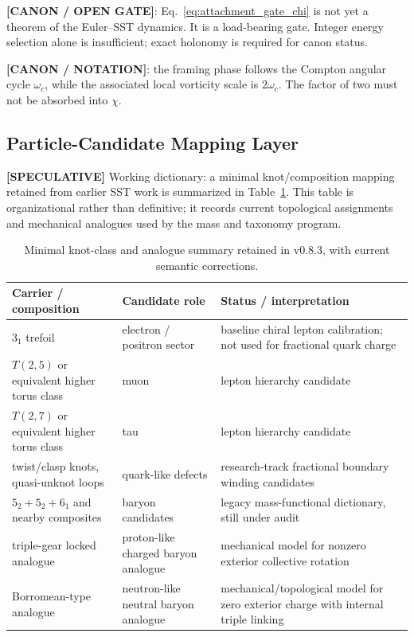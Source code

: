 \documentclass[11pt]{article}
\theoremstyle{definition}
\theoremstyle{plain}
\theoremstyle{remark}
\begin{document}
        \textbf{[CANON / OPEN GATE]}: Eq.~\eqref{eq:attachment_gate_chi} is not yet a theorem of the Euler--SST dynamics. It is a load-bearing gate. Integer energy selection alone is insufficient; exact holonomy is required for canon status.

        \textbf{[CANON / NOTATION]}: the framing phase follows the Compton angular cycle $\omega_c$, while the associated local vorticity scale is $2\omega_c$. The factor of two must not be absorbed into $\chi$.


    \subsection{Particle-Candidate Mapping Layer}
        \label{subsec:integration_knotmap}

        \textbf{[SPECULATIVE]} Working dictionary: a minimal knot/composition mapping retained from earlier SST work is summarized in Table~\ref{tab:particle_candidate_mapping}. This table is organizational rather than definitive; it records current topological assignments and mechanical analogues used by the mass and taxonomy program.

        \begin{table}[h]
        \centering
        \caption{Minimal knot-class and analogue summary retained in v0.8.3, with current semantic corrections.}
        \label{tab:particle_candidate_mapping}
        \begin{tabular}{lll}
        \hline
        Carrier / composition & Candidate role & Status / interpretation \\
        \hline
        $3_1$ trefoil & electron / positron sector & baseline chiral lepton calibration; not used for fractional quark charge \\
        $T(2,5)$ or equivalent higher torus class & muon & lepton hierarchy candidate \\
        $T(2,7)$ or equivalent higher torus class & tau & lepton hierarchy candidate \\
        twist/clasp knots, quasi-unknot loops & quark-like defects & research-track fractional boundary winding candidates \\
        $5_2+5_2+6_1$ and nearby composites & baryon candidates & legacy mass-functional dictionary, still under audit \\
        triple-gear locked analogue & proton-like charged baryon analogue & mechanical model for nonzero exterior collective rotation \\
        Borromean-type analogue & neutron-like neutral baryon analogue & mechanical/topological model for zero exterior charge with internal triple linking \\
        \hline
        \end{tabular}
        \end{table}
\end{document}
